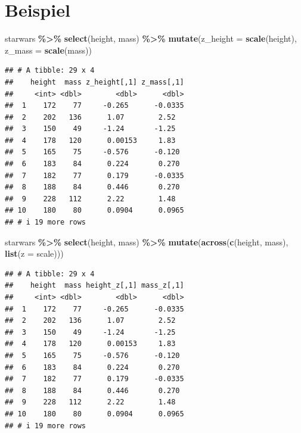 \documentclass[
  ngerman,
]{book}
\newenvironment{Shaded}{\begin{snugshade}}{\end{snugshade}}
\newcommand{\AttributeTok}[1]{\textcolor[rgb]{0.13,0.29,0.53}{#1}}
\newcommand{\FunctionTok}[1]{\textcolor[rgb]{0.13,0.29,0.53}{\textbf{#1}}}
\newcommand{\NormalTok}[1]{#1}
\newcommand{\SpecialCharTok}[1]{\textcolor[rgb]{0.81,0.36,0.00}{\textbf{#1}}}
\begin{document}
\section{Beispiel}\label{beispiel-1}

\begin{Shaded}
\begin{Highlighting}[]
\NormalTok{starwars }\SpecialCharTok{\%\textgreater{}\%} 
  \FunctionTok{select}\NormalTok{(height, mass) }\SpecialCharTok{\%\textgreater{}\%} 
  \FunctionTok{mutate}\NormalTok{(}\AttributeTok{z\_height =} \FunctionTok{scale}\NormalTok{(height),}
         \AttributeTok{z\_mass =} \FunctionTok{scale}\NormalTok{(mass)) }
\end{Highlighting}
\end{Shaded}

\begin{verbatim}
## # A tibble: 29 x 4
##    height  mass z_height[,1] z_mass[,1]
##     <int> <dbl>        <dbl>      <dbl>
##  1    172    77     -0.265      -0.0335
##  2    202   136      1.07        2.52  
##  3    150    49     -1.24       -1.25  
##  4    178   120      0.00153     1.83  
##  5    165    75     -0.576      -0.120 
##  6    183    84      0.224       0.270 
##  7    182    77      0.179      -0.0335
##  8    188    84      0.446       0.270 
##  9    228   112      2.22        1.48  
## 10    180    80      0.0904      0.0965
## # i 19 more rows
\end{verbatim}

\begin{Shaded}
\begin{Highlighting}[]
\NormalTok{starwars }\SpecialCharTok{\%\textgreater{}\%}
  \FunctionTok{select}\NormalTok{(height, mass) }\SpecialCharTok{\%\textgreater{}\%} 
  \FunctionTok{mutate}\NormalTok{(}\FunctionTok{across}\NormalTok{(}\FunctionTok{c}\NormalTok{(height, mass), }\FunctionTok{list}\NormalTok{(}\AttributeTok{z =}\NormalTok{ scale)))}
\end{Highlighting}
\end{Shaded}

\begin{verbatim}
## # A tibble: 29 x 4
##    height  mass height_z[,1] mass_z[,1]
##     <int> <dbl>        <dbl>      <dbl>
##  1    172    77     -0.265      -0.0335
##  2    202   136      1.07        2.52  
##  3    150    49     -1.24       -1.25  
##  4    178   120      0.00153     1.83  
##  5    165    75     -0.576      -0.120 
##  6    183    84      0.224       0.270 
##  7    182    77      0.179      -0.0335
##  8    188    84      0.446       0.270 
##  9    228   112      2.22        1.48  
## 10    180    80      0.0904      0.0965
## # i 19 more rows
\end{verbatim}
\end{document}
